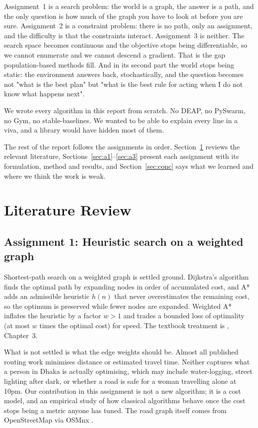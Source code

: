 \documentclass{ai-lab-report}
\begin{document}
Assignment~1 is a search problem: the world is a graph, the answer is a path, and the
only question is how much of the graph you have to look at before you are sure. Assignment~2
is a constraint problem: there is no path, only an assignment, and the difficulty is that
the constraints interact. Assignment~3 is neither. The search space
becomes continuous and the objective stops being differentiable, so we cannot enumerate
and we cannot descend a gradient. That is the gap population-based methods fill. And in
its second part the world stops being static: the environment answers back, stochastically,
and the question becomes not "what is the best plan" but "what is the best rule for acting
when I do not know what happens next".

We wrote every algorithm in this report from scratch. No DEAP, no PySwarm, no Gym, no
stable-baselines. We wanted to be able to explain every line in a viva, and a library would have
hidden most of them.

The rest of the report follows the assignments in order. Section~\ref{sec:lit} reviews the
relevant literature, Sections~\ref{sec:a1}--\ref{sec:a3} present each assignment with its
formulation, method and results, and Section~\ref{sec:conc} says what we learned and where
we think the work is weak.

\section{Literature Review}
\label{sec:lit}

\subsection{Assignment 1: Heuristic search on a weighted graph}
Shortest-path search on a weighted graph is settled ground. Dijkstra's algorithm
\citep{dijkstra1959note} finds the optimal path by expanding nodes in order of
accumulated cost, and A* \citep{hart1968astar} adds an admissible heuristic $h(n)$ that
never overestimates the remaining cost, so the optimum is preserved while fewer nodes are
expanded. Weighted A* \citep{pohl1970heuristic} inflates the heuristic by a factor $w>1$
and trades a bounded loss of optimality (at most $w$ times the optimal cost) for speed.
The textbook treatment is \citet{russell2021ai}, Chapter~3.

What is not settled is what the edge weights should be. Almost all published routing work
minimises distance or estimated travel time. Neither captures what a person in Dhaka is
actually optimising, which may include water-logging, street lighting after dark, or
whether a road is safe for a woman travelling alone at 10pm. Our contribution in this
assignment is not a new algorithm; it is a cost model, and an empirical study of how
classical algorithms behave once the cost stops being a metric anyone has tuned. The road
graph itself comes from OpenStreetMap via OSMnx \citep{boeing2017osmnx}.
\end{document}
